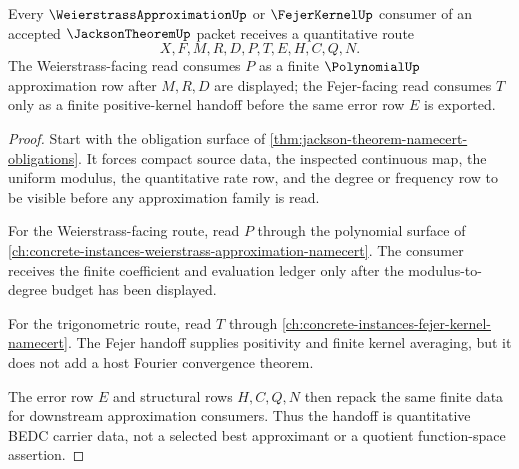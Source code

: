 \begin{theorem}
\label{thm:jackson-theorem-weierstrass-handoff}
Every $\WeierstrassApproximationUp$ or $\FejerKernelUp$ consumer of an accepted $\JacksonTheoremUp$ packet receives a quantitative route
$$
X,F,M,R,D,P,T,E,H,C,Q,N .
$$
The Weierstrass-facing read consumes $P$ as a finite $\PolynomialUp$ approximation row after $M,R,D$ are displayed; the Fejer-facing read consumes $T$ only as a finite positive-kernel handoff before the same error row $E$ is exported.
\end{theorem}
\begin{proof}
Start with the obligation surface of \autoref{thm:jackson-theorem-namecert-obligations}. It forces compact source data, the inspected continuous map, the uniform modulus, the quantitative rate row, and the degree or frequency row to be visible before any approximation family is read.

For the Weierstrass-facing route, read $P$ through the polynomial surface of \autoref{ch:concrete-instances-weierstrass-approximation-namecert}. The consumer receives the finite coefficient and evaluation ledger only after the modulus-to-degree budget has been displayed.

For the trigonometric route, read $T$ through \autoref{ch:concrete-instances-fejer-kernel-namecert}. The Fejer handoff supplies positivity and finite kernel averaging, but it does not add a host Fourier convergence theorem.

The error row $E$ and structural rows $H,C,Q,N$ then repack the same finite data for downstream approximation consumers. Thus the handoff is quantitative BEDC carrier data, not a selected best approximant or a quotient function-space assertion.
\end{proof}



